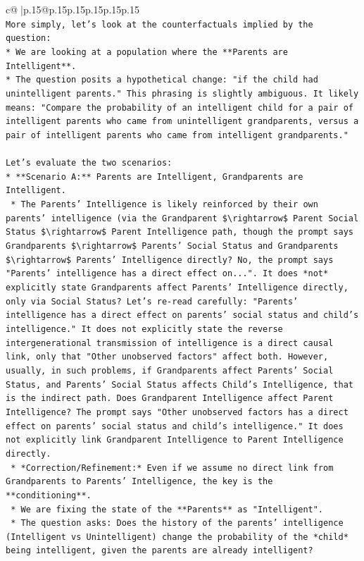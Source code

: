 \documentclass{article}
\begin{document}
{\begin{supertabular}{c@{$\;$}|p{.15\linewidth}@{}p{.15\linewidth}p{.15\linewidth}p{.15\linewidth}p{.15\linewidth}p{.15\linewidth}}
{{{\\ 
\texttt{More simply, let's look at the counterfactuals implied by the question:} \\
\texttt{*   We are looking at a population where the **Parents are Intelligent**.} \\
\texttt{*   The question posits a hypothetical change: "if the child had unintelligent parents." This phrasing is slightly ambiguous. It likely means: "Compare the probability of an intelligent child for a pair of intelligent parents who came from unintelligent grandparents, versus a pair of intelligent parents who came from intelligent grandparents."} \\
\\ 
\texttt{Let's evaluate the two scenarios:} \\
\texttt{*   **Scenario A:** Parents are Intelligent, Grandparents are Intelligent.} \\
\texttt{    *   The Parents' Intelligence is likely reinforced by their own parents' intelligence (via the Grandparent \$\textbackslash{}rightarrow\$ Parent Social Status \$\textbackslash{}rightarrow\$ Parent Intelligence path, though the prompt says Grandparents \$\textbackslash{}rightarrow\$ Parents' Social Status and Grandparents \$\textbackslash{}rightarrow\$ Parents' Intelligence directly? No, the prompt says "Parents' intelligence has a direct effect on...". It does *not* explicitly state Grandparents affect Parents' Intelligence directly, only via Social Status? Let's re{-}read carefully: "Parents' intelligence has a direct effect on parents' social status and child's intelligence." It does not explicitly state the reverse intergenerational transmission of intelligence is a direct causal link, only that "Other unobserved factors" affect both. However, usually, in such problems, if Grandparents affect Parents' Social Status, and Parents' Social Status affects Child's Intelligence, that is the indirect path. Does Grandparent Intelligence affect Parent Intelligence? The prompt says "Other unobserved factors has a direct effect on parents' social status and child's intelligence." It does not explicitly link Grandparent Intelligence to Parent Intelligence directly.} \\
\texttt{    *   *Correction/Refinement:* Even if we assume no direct link from Grandparents to Parents' Intelligence, the key is the **conditioning**.} \\
\texttt{    *   We are fixing the state of the **Parents** as "Intelligent".} \\
\texttt{    *   The question asks: Does the history of the parents' intelligence (Intelligent vs Unintelligent) change the probability of the *child* being intelligent, given the parents are already intelligent?} \\
}}}
\end{supertabular}}
\end{document}
